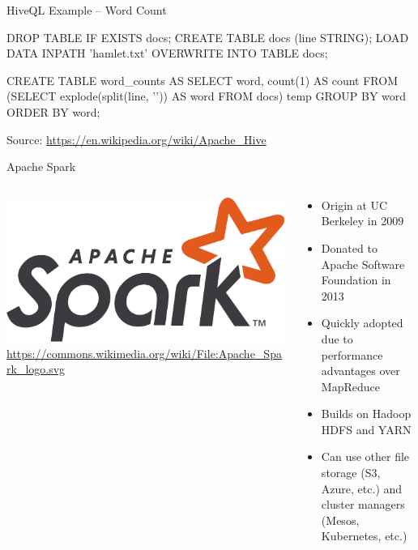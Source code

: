 \documentclass[ignorenonframetext,xcolor=x11names]{beamer}
\begin{document}
\begin{frame}[fragile]{HiveQL Example -- Word Count}
\begin{sqlcode}
DROP TABLE IF EXISTS docs;
CREATE TABLE docs (line STRING);
LOAD DATA INPATH 'hamlet.txt' 
  OVERWRITE INTO TABLE docs;
  
CREATE TABLE word_counts AS
SELECT word, count(1) AS count FROM
  (SELECT explode(split(line, '\s')) 
    AS word FROM docs) temp
GROUP BY word
ORDER BY word;
\end{sqlcode}
\small Source: \url{https://en.wikipedia.org/wiki/Apache_Hive}
\end{frame}

\begin{frame}{Apache Spark}
\begin{columns}
\begin{column}{.4\textwidth}
\includegraphics[width=\textwidth]{spark_logo.png}
\tiny \url{https://commons.wikimedia.org/wiki/File:Apache_Spark_logo.svg} \normalsize
\end{column}
\begin{column}{.6\textwidth}
\begin{itemize}
    \item Origin at UC Berkeley in 2009
    \item Donated to Apache Software Foundation in 2013
    \item Quickly adopted due to performance advantages over MapReduce
    \item Builds on Hadoop HDFS and YARN
    \item Can use other file storage (S3, Azure, etc.) and cluster managers (Mesos, Kubernetes, etc.)
\end{itemize}
\end{column}
\end{columns}
\end{frame}
\end{document}
